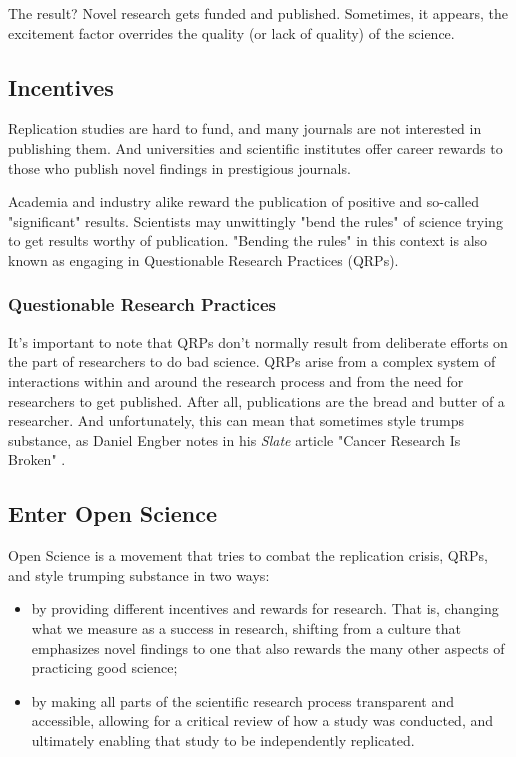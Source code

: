 \documentclass[
]{book}
\providecommand{\tightlist}{%
  \setlength{\itemsep}{0pt}\setlength{\parskip}{0pt}}
\begin{document}
The result? Novel research gets funded and published. Sometimes, it appears, the excitement factor overrides the quality (or lack of quality) of the science.

\hypertarget{incentives}{%
\subsection*{Incentives}\label{incentives}}

Replication studies are hard to fund, and many journals are not interested in publishing them. And universities and scientific institutes offer career rewards to those who publish novel findings in prestigious journals.

Academia and industry alike reward the publication of positive and so-called "significant" results. Scientists may unwittingly "bend the rules" of science trying to get results worthy of publication. "Bending the rules" in this context is also known as engaging in Questionable Research Practices (QRPs).

\hypertarget{questionable-research-practices}{%
\subsubsection*{Questionable Research Practices}\label{questionable-research-practices}}

It's important to note that QRPs don't normally result from deliberate efforts on the part of researchers to do bad science. QRPs arise from a complex system of interactions within and around the research process and from the need for researchers to get published. After all, publications are the bread and butter of a researcher. And unfortunately, this can mean that sometimes style trumps substance, as Daniel Engber notes in his \emph{Slate} article "Cancer Research Is Broken" \citep{engber_cancer_2016}.

\hypertarget{enter-open-science}{%
\subsection*{Enter Open Science}\label{enter-open-science}}

Open Science is a movement that tries to combat the replication crisis, QRPs, and style trumping substance in two ways:

\begin{itemize}
\tightlist
\item
  by providing different incentives and rewards for research. That is, changing what we measure as a success in research, shifting from a culture that emphasizes novel findings to one that also rewards the many other aspects of practicing good science;
\item
  by making all parts of the scientific research process transparent and accessible, allowing for a critical review of how a study was conducted, and ultimately enabling that study to be independently replicated.
\end{itemize}
\end{document}
